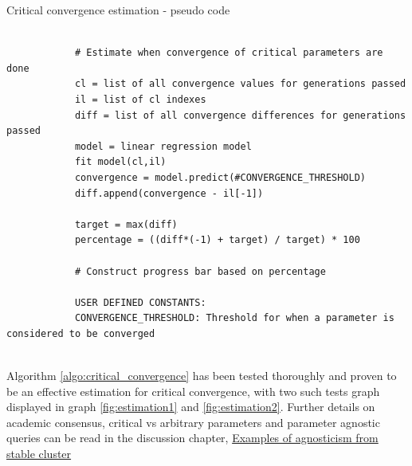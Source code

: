\documentclass[a4paper,english]{report}
\begin{document}
		\begin{algorithm}
			\caption{Critical convergence estimation - pseudo code}\label{algo:critical_convergence}
			\scriptsize
			\begin{verbatim}
			
			# Estimate when convergence of critical parameters are done
			cl = list of all convergence values for generations passed
			il = list of cl indexes
			diff = list of all convergence differences for generations passed
			model = linear regression model
			fit model(cl,il)
			convergence = model.predict(#CONVERGENCE_THRESHOLD)
			diff.append(convergence - il[-1])
			
			target = max(diff)
			percentage = ((diff*(-1) + target) / target) * 100
			
			# Construct progress bar based on percentage
			
			USER DEFINED CONSTANTS:
			CONVERGENCE_THRESHOLD: Threshold for when a parameter is considered to be converged
			
			\end{verbatim}
		\end{algorithm}
		\clearpage
		Algorithm \ref{algo:critical_convergence} has been tested thoroughly and proven to be an effective estimation for critical convergence, with two such tests graph displayed in graph \ref{fig:estimation1} and \ref{fig:estimation2}. Further details on academic consensus, critical vs arbitrary parameters and parameter agnostic queries can be read in the discussion chapter, \hyperref[sec:param_agno]{Examples of agnosticism from stable cluster}
\end{document}
